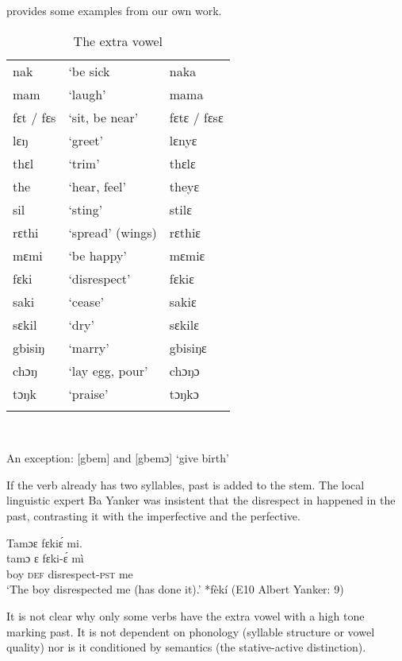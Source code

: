  provides some examples from our own work.

\begin{table}
\caption{\label{tab:verbmorph:29}The extra vowel}



\begin{tabular}{lll}
\lsptoprule
nak & ‘be sick & naka\\
mam & ‘laugh' & mama\\
fɛt / fɛs & ‘sit, be near' & fɛtɛ / fɛsɛ\\
lɛŋ & ‘greet' & lɛnyɛ\\
thɛl & ‘trim' & thɛlɛ\\
the & ‘hear, feel' & theyɛ\\
sil & ‘sting' & stilɛ\\
rɛthi & ‘spread' (wings) & rɛthiɛ\\
mɛmi & ‘be happy' & mɛmiɛ\\
fɛki & ‘disrespect' & fɛkiɛ\\
saki & ‘cease' & sakiɛ\\
sɛkil & ‘dry' & sɛkilɛ\\
gbisiŋ & ‘marry' & gbisiŋɛ\\
chɔŋ & ‘lay egg, pour' & chɔŋɔ\\
tɔŋk & ‘praise' & tɔŋkɔ\\
\lspbottomrule
\end{tabular}
\\\centering\parbox[t]{.6\textwidth}{An exception: [gbem] and [gbemɔ] ‘give birth'}
\end{table}



If the verb already has two syllables, past is added to the stem. The local linguistic expert Ba Yanker was insistent that the disrespect in  happened in the past, contrasting it with the imperfective and the perfective.

\ea%
    \label{ex:118}
    \ea Tamɔɛ fɛkiɛ́ mi.\\
    \gll tamɔ  ɛ    fɛki-ɛ́          mì\\
    boy  \textsc{def}  disrespect\textsc{{}-pst}   me\\
    \glt ‘The boy disrespected me (has done it).' *fèkí (E10 Albert Yanker: 9)
    \z
    \z

It is not clear why only some verbs have the extra vowel with a high tone marking past. It is not dependent on phonology (syllable structure or vowel quality) nor is it conditioned by semantics (the stative-active distinction).

